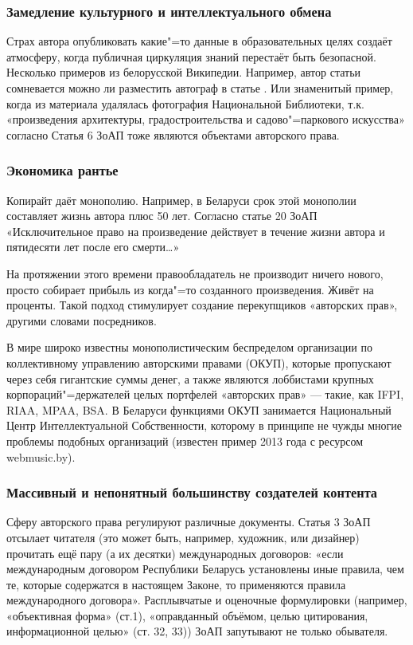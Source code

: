 \documentclass[10pt, a5paper]{article}
\begin{document}
\subsubsection*{Замедление культурного и интеллектуального обмена}

Страх автора опубликовать какие"=то данные в образовательных целях создаёт атмосферу, когда публичная циркуляция знаний перестаёт быть безопасной. Несколько примеров из белорусской Википедии. Например, автор статьи сомневается можно ли разместить автограф в статье \cite{Volchak1}. Или знаменитый пример, когда из материала удалялась фотография Национальной Библиотеки, т.к. «произведения архитектуры, градостроительства и садово"=паркового искусства» согласно Статья 6 ЗоАП тоже являются объектами авторского права. 

\subsubsection*{Экономика рантье}

Копирайт даёт монополию. Например, в Беларуси срок этой монополии составляет жизнь автора плюс 50 лет. Согласно статье 20 ЗоАП «Исключительное право на произведение действует в течение жизни автора и пятидесяти лет после его смерти\ldots{}»

На протяжении этого времени правообладатель не производит ничего нового, просто собирает прибыль из когда"=то созданного произведения. Живёт на проценты. Такой подход стимулирует создание перекупщиков «авторских прав», другими словами посредников.

В мире широко известны монополистическим беспределом организации по коллективному управлению авторскими правами \linebreak(ОКУП), которые пропускают через себя гигантские суммы денег, а также являются лоббистами крупных корпораций"=держателей целых портфелей «авторских прав» --- такие, как IFPI, RIAA, MPAA, BSA. В Беларуси функциями ОКУП занимается Национальный Центр Интеллектуальной Собственности, которому в принципе не чужды многие проблемы подобных организаций (известен пример 2013 года с ресурсом webmusic.by).

\subsubsection*{Массивный и непонятный большинству создателей контента}

Сферу авторского права регулируют различные документы. \linebreak Статья 3 ЗоАП отсылает читателя (это может быть, например, художник, или дизайнер) прочитать ещё пару (а их десятки) международных договоров: «если международным договором Республики Беларусь установлены иные правила, чем те, которые содержатся в настоящем Законе, то применяются правила международного договора». Расплывчатые и оценочные формулировки (например, «объективная форма» (ст.1), «оправданный объёмом, целью цитирования, информационной целью» (ст. 32, 33)) ЗоАП запутывают не только обывателя.
\end{document}
